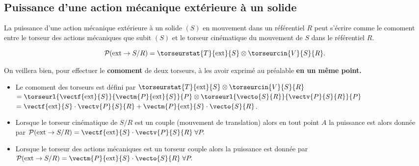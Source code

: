 \subsection{Puissance d'une action mécanique extérieure à un solide}
\begin{defi}
La puissance d'une action mécanique extérieure à un solide $(S)$ en mouvement dans un référentiel $R$ peut s'écrire comme le comoment entre le torseur des actions mécaniques que subit $(S)$ et le torseur cinématique du mouvement de $S$ dans le référentiel $R$.

$$
\mathcal{P}(\text{ext} \rightarrow S/R)=\torseurstat{T}{\text{ext}}{S}\otimes \torseurcin{V}{S}{R}.
$$
\end{defi}



\begin{warn}
On veillera bien, pour effectuer le \textbf{comoment} de deux torseurs, à les avoir exprimé au préalable {\textbf{en un même point.}}
\end{warn}

\begin{remarque}%
\begin{itemize}
\item Le comoment des torseurs est défini par 
$\torseurstat{T}{\text{ext}}{S}\otimes \torseurcin{V}{S}{R}$
$=
\torseurl{\vectf{\text{ext}}{S}}{\vectm{P}{\text{ext}}{S}}{P}
\otimes \torseurl{\vecto{S}{R}}{\vectv{P}{S}{R}}{P}$ 
$=\vectf{\text{ext}}{S}\cdot \vectv{P}{S}{R}+ \vectm{P}{\text{ext}}{S}\cdot\vecto{S}{R}$.

\item Lorsque le torseur cinématique de $S/R$ est un couple (mouvement de translation) alors en tout point $A$ la puissance est alors donnée par
$
\mathcal{P}(\text{ext} \rightarrow S/R)=\vectf{\text{ext}}{S}\cdot \vectv{P}{S}{R} \;
\forall P.
$

\item Lorsque le torseur des actions mécaniques est un torseur couple alors la puissance est donnée par
$
\mathcal{P}(\text{ext} \rightarrow S/R)=\vectm{P}{\text{ext}}{S}\cdot\vecto{S}{R}\;
\forall P.
$

\end{itemize}
\end{remarque}%





